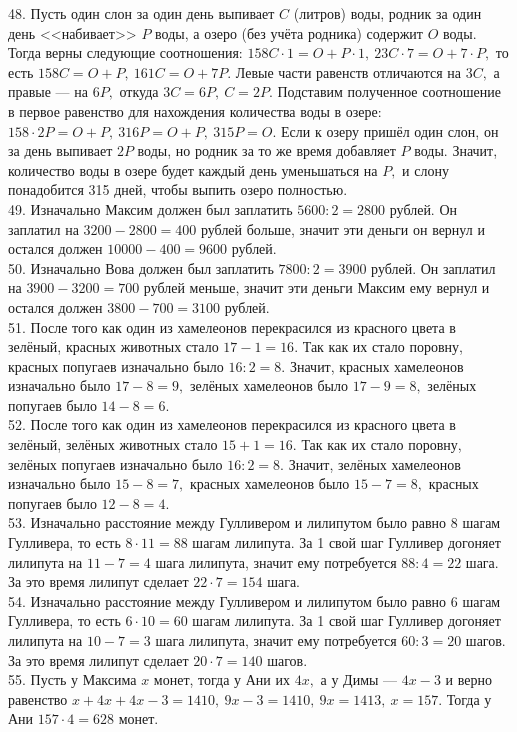 \documentclass[12pt]{article}
\begin{document}
48. Пусть один слон за один день выпивает $C$ (литров) воды, родник за один день <<набивает>> $P$ воды, а озеро (без учёта родника) содержит $O$ воды. Тогда верны следующие соотношения: $158C\cdot1=O+P\cdot1,\ 23C\cdot7=O+7\cdot P,$ то есть $158C=O+P,\ 161C=O+7P.$ Левые части равенств отличаются на $3C,$ а правые --- на $6P,$ откуда $3C=6P,\ C=2P.$ Подставим полученное соотношение в первое равенство для нахождения количества воды в озере: $158\cdot2P=O+P,\ 316P=O+P,\ 315P=O.$ Если к озеру пришёл один слон, он за день выпивает $2P$ воды, но родник за то же время добавляет $P$ воды. Значит, количество воды в озере будет каждый день уменьшаться на $P,$ и слону понадобится 315 дней, чтобы выпить озеро полностью.\\
49. Изначально Максим должен был заплатить $5600:2=2800$ рублей. Он заплатил на $3200-2800=400$ рублей больше, значит эти деньги он вернул и остался должен $10000-400=9600$ рублей.\\
50. Изначально Вова должен был заплатить $7800:2=3900$ рублей. Он заплатил на $3900-3200=700$ рублей меньше, значит эти деньги Максим ему вернул и остался должен $3800-700=3100$ рублей.\\
51. После того как один из хамелеонов перекрасился из красного цвета в зелёный, красных животных стало $17-1=16.$ Так как их стало поровну, красных попугаев изначально было $16:2=8.$ Значит, красных хамелеонов изначально было $17-8=9,$ зелёных хамелеонов было $17-9=8,$ зелёных попугаев было $14-8=6.$\\
52. После того как один из хамелеонов перекрасился из красного цвета в зелёный, зелёных животных стало $15+1=16.$ Так как их стало поровну, зелёных попугаев изначально было $16:2=8.$ Значит, зелёных хамелеонов изначально было $15-8=7,$ красных хамелеонов было $15-7=8,$ красных попугаев было $12-8=4.$\\
53. Изначально расстояние между Гулливером и лилипутом было равно 8 шагам Гулливера, то есть $8\cdot11=88$ шагам лилипута. За 1 свой шаг Гулливер догоняет лилипута на $11-7=4$ шага лилипута, значит ему потребуется $88:4=22$ шага. За это время лилипут сделает $22\cdot7=154$ шага.\\
54. Изначально расстояние между Гулливером и лилипутом было равно 6 шагам Гулливера, то есть $6\cdot10=60$ шагам лилипута. За 1 свой шаг Гулливер догоняет лилипута на $10-7=3$ шага лилипута, значит ему потребуется $60:3=20$ шагов. За это время лилипут сделает $20\cdot7=140$ шагов.\\
55. Пусть у Максима $x$ монет, тогда у Ани их $4x,$ а у Димы --- $4x-3$ и верно равенство $x+4x+4x-3=1410,\ 9x-3=1410,\ 9x=1413,\ x=157.$ Тогда у Ани $157\cdot4=628$ монет.\\
\end{document}
